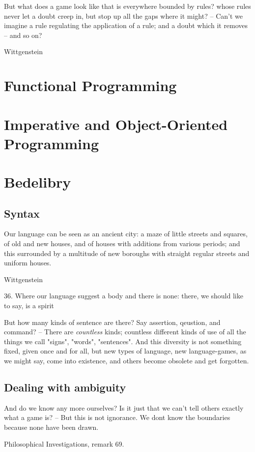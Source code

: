 \documentclass{book}
\begin{document}
\epigraph{But what does a game look like that is everywhere bounded by rules? whose rules never let a doubt creep in, but stop up all the gaps where it might? -- Can't we imagine a rule regulating the application of a rule; and a doubt which it removes -- and so on?}{Wittgenstein}

\chapter{Functional Programming}

\chapter{Imperative and Object-Oriented Programming}

\chapter{Bedelibry}

\section{Syntax}

\epigraph{Our language can be seen as an ancient city: a maze of little streets and squares, of old and new houses, and of houses with additions from various periods; and this surrounded by a multitude of new boroughs with straight regular streets and uniform houses.}{Wittgenstein}

36. Where our language suggest a body and there is none: there, we should like to say, is a spirit

But how many kinds of sentence are there? Say assertion, qeustion, and command? -- There are \textit{countless} kinds; countless different kinds of use of all the things we call "signs", "words", "sentences". And this diversity is not something fixed, given once and for all, but new types of language, new language-games, as we might say, come into existence, and others become obsolete and get forgotten.

\section{Dealing with ambiguity}

\epigraph{And do we know any more ourselves? Is it just that we can't tell others exactly what a game is? -- But this is not ignorance. We dont know the boundaries because none have been drawn.}{Philosophical Investigations, remark 69.}
\end{document}

